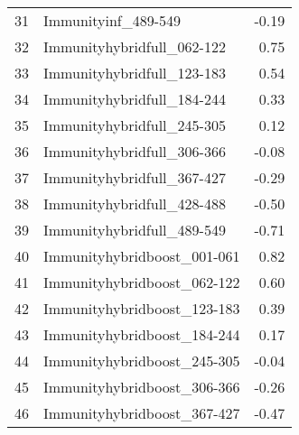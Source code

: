 \begin{table}[ht]
\begin{tabular}{rlr}
  31 & Immunityinf\_489-549 & -0.19 \\ 
  32 & Immunityhybridfull\_062-122 & 0.75 \\ 
  33 & Immunityhybridfull\_123-183 & 0.54 \\ 
  34 & Immunityhybridfull\_184-244 & 0.33 \\ 
  35 & Immunityhybridfull\_245-305 & 0.12 \\ 
  36 & Immunityhybridfull\_306-366 & -0.08 \\ 
  37 & Immunityhybridfull\_367-427 & -0.29 \\ 
  38 & Immunityhybridfull\_428-488 & -0.50 \\ 
  39 & Immunityhybridfull\_489-549 & -0.71 \\ 
  40 & Immunityhybridboost\_001-061 & 0.82 \\ 
  41 & Immunityhybridboost\_062-122 & 0.60 \\ 
  42 & Immunityhybridboost\_123-183 & 0.39 \\ 
  43 & Immunityhybridboost\_184-244 & 0.17 \\ 
  44 & Immunityhybridboost\_245-305 & -0.04 \\ 
  45 & Immunityhybridboost\_306-366 & -0.26 \\ 
  46 & Immunityhybridboost\_367-427 & -0.47 \\ 
   \hline
\end{tabular}
\end{table}
